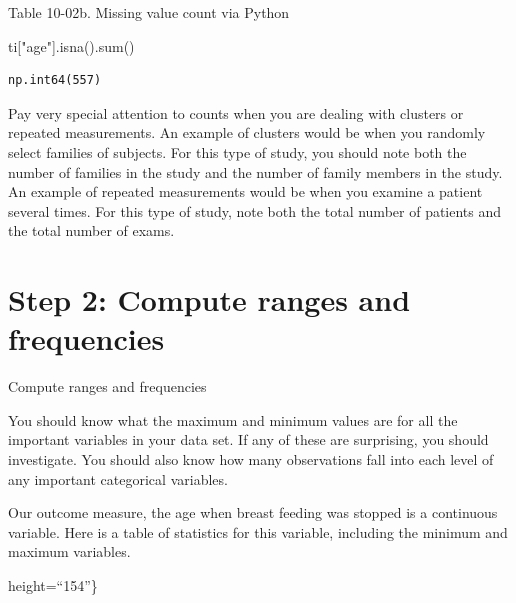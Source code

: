 \documentclass[
  letterpaper,
  DIV=11,
  numbers=noendperiod]{scrreprt}
\newenvironment{Shaded}{\begin{snugshade}}{\end{snugshade}}
\newcommand{\BuiltInTok}[1]{\textcolor[rgb]{0.00,0.23,0.31}{#1}}
\newcommand{\NormalTok}[1]{\textcolor[rgb]{0.00,0.23,0.31}{#1}}
\newcommand{\StringTok}[1]{\textcolor[rgb]{0.13,0.47,0.30}{#1}}
\begin{document}
\begin{tcolorbox}[enhanced jigsaw, arc=.35mm, bottomrule=.15mm, bottomtitle=1mm, breakable, colback=white, colbacktitle=quarto-callout-tip-color!10!white, colframe=quarto-callout-tip-color-frame, coltitle=black, left=2mm, leftrule=.75mm, opacityback=0, opacitybacktitle=0.6, rightrule=.15mm, title=\textcolor{quarto-callout-tip-color}{\faLightbulb}\hspace{0.5em}{Tip}, titlerule=0mm, toprule=.15mm, toptitle=1mm]

Table 10-02b. Missing value count via Python

\begin{Shaded}
\begin{Highlighting}[]
\NormalTok{ti[}\StringTok{"age"}\NormalTok{].isna().}\BuiltInTok{sum}\NormalTok{()}
\end{Highlighting}
\end{Shaded}

\begin{verbatim}
np.int64(557)
\end{verbatim}

Pay very special attention to counts when you are dealing with clusters
or repeated measurements. An example of clusters would be when you
randomly select families of subjects. For this type of study, you should
note both the number of families in the study and the number of family
members in the study. An example of repeated measurements would be when
you examine a patient several times. For this type of study, note both
the total number of patients and the total number of exams.

\section{Step 2: Compute ranges and
frequencies}\label{step-2-compute-ranges-and-frequencies}

Compute ranges and frequencies

You should know what the maximum and minimum values are for all the
important variables in your data set. If any of these are surprising,
you should investigate. You should also know how many observations fall
into each level of any important categorical variables.

Our outcome measure, the age when breast feeding was stopped is a
continuous variable. Here is a table of statistics for this variable,
including the minimum and maximum variables.

height=``154''\}


\end{tcolorbox}
\end{document}
